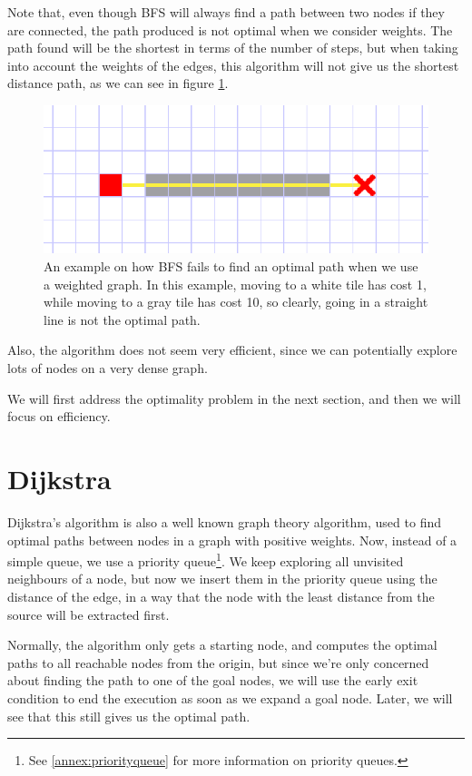 \documentclass[a4paper,10pt]{report}
\begin{document}
Note that, even though BFS will always find a path between two nodes if they are connected, the path produced is not optimal when we consider weights. The path found will be the shortest in terms of the number of steps, but when taking into account the weights of the edges, this algorithm will not give us the shortest distance path, as we can see in figure \ref{fig:bfs-fail}.

\begin{figure}
\centering
\includegraphics[width=1\linewidth]{bfs-fail}
\caption{An example on how BFS fails to find an optimal path when we use a weighted graph. In this example, moving to a white tile has cost 1, while moving to a gray tile has cost 10, so clearly, going in a straight line is not the optimal path.}
\label{fig:bfs-fail}
\end{figure}

Also, the algorithm does not seem very efficient, since we can potentially explore lots of nodes on a very dense graph.

We will first address the optimality problem in the next section, and then we will focus on efficiency.


\section{Dijkstra}
Dijkstra's algorithm \cite{dijkstra} is also a well known graph theory algorithm, used to find optimal paths between nodes in a graph with positive weights. Now, instead of a simple queue, we use a priority queue\footnote{See \ref{annex:priorityqueue} for more information on priority queues.}. We keep exploring all unvisited neighbours of a node, but now we insert them in the priority queue using the distance of the edge, in a way that the node with the least distance from the source will be extracted first.

Normally, the algorithm only gets a starting node, and computes the optimal paths to all reachable nodes from the origin, but since we're only concerned about finding the path to one of the goal nodes, we will use the early exit condition to end the execution as soon as we expand a goal node. Later, we will see that this still gives us the optimal path.
\end{document}
